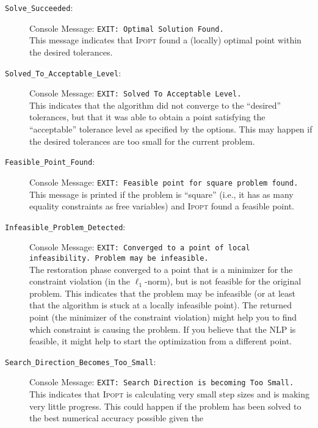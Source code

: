 \documentclass[10pt]{article}
\newcommand{\Ipopt}{\textsc{Ipopt}\xspace}
\begin{document}
\begin{description}
\item[{\tt Solve\_Succeeded}:] $\;$ \\
  Console Message: {\tt EXIT: Optimal Solution Found.} \\
  This message indicates that \Ipopt found a (locally) optimal point
  within the desired tolerances.
\item[{\tt Solved\_To\_Acceptable\_Level}:]  $\;$ \\
  Console Message: {\tt EXIT: Solved To Acceptable Level.} \\
  This indicates that the algorithm did not converge to the
  ``desired'' tolerances, but that it was able to obtain a point
  satisfying the ``acceptable'' tolerance level as specified by the
   options.
  This may happen if the desired tolerances
  are too small for the current problem.
\item[{\tt Feasible\_Point\_Found}:]  $\;$ \\
  Console Message: {\tt EXIT: Feasible point for square problem found.} \\
  This message is printed if the problem is ``square'' (i.e., it has
  as many equality constraints as free variables) and \Ipopt found a
  feasible point.
\item[{\tt Infeasible\_Problem\_Detected}:]  $\;$ \\
  Console Message: {\tt EXIT: Converged to a point of
    local infeasibility. Problem may be infeasible.} \\
  The restoration phase converged to a point that is a minimizer for
  the constraint violation (in the $\ell_1$-norm), but is not feasible
  for the original problem. This indicates that the problem may be
  infeasible (or at least that the algorithm is stuck at a locally
  infeasible point).  The returned point (the minimizer of the
  constraint violation) might help you to find which constraint is
  causing the problem.  If you believe that the NLP is feasible,
  it might help to start the optimization from a different point.
\item[{\tt Search\_Direction\_Becomes\_Too\_Small}:]  $\;$ \\
  Console Message: {\tt EXIT: Search Direction is becoming Too Small.} \\
  This indicates that \Ipopt is calculating very small step sizes and
  is making very little progress.  This could happen if the problem has
  been solved to the best numerical accuracy possible given the

\end{description}
\end{document}
